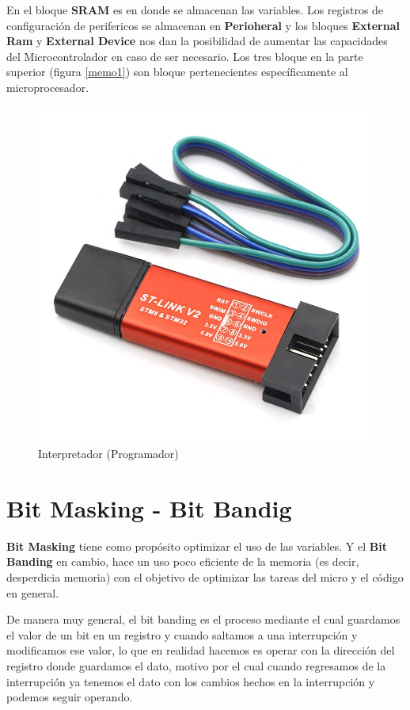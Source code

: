 \documentclass[a4paper,12pt]{report} %
\begin{document}
En el bloque \textbf{SRAM} es en donde se almacenan las variables. Los registros de configuración de perifericos se almacenan en \textbf{Perioheral} y los bloques \textbf{External Ram} y \textbf{External Device} nos dan la posibilidad de aumentar las capacidades del Microcontrolador en caso de ser necesario. Los tres bloque en la parte superior (figura \ref{memo1}) son bloque pertenecientes específicamente al microprocesador.


\begin{figure}[H]
	\centering
	\includegraphics[scale=0.3]{Imagenes/stm/stlink}
	\caption{Interpretador (Programador)}
	\label{stlink}
\end{figure}

\section{Bit Masking - Bit Bandig}

\textbf{Bit Masking} tiene como propósito optimizar el uso de las variables. Y el \textbf{Bit Banding} en cambio, hace un uso poco eficiente de la memoria (es decir, desperdicia memoria) con el objetivo de optimizar las tareas del micro y el código en general.

De manera muy general, el bit banding es el proceso mediante el cual guardamos el valor de un bit en un registro y cuando saltamos a una interrupción y modificamos ese valor, lo que en realidad hacemos es operar con la dirección del registro donde guardamos el dato, motivo por el cual cuando regresamos de la interrupción ya tenemos el dato con los cambios hechos en la interrupción y podemos seguir operando.
\end{document}

